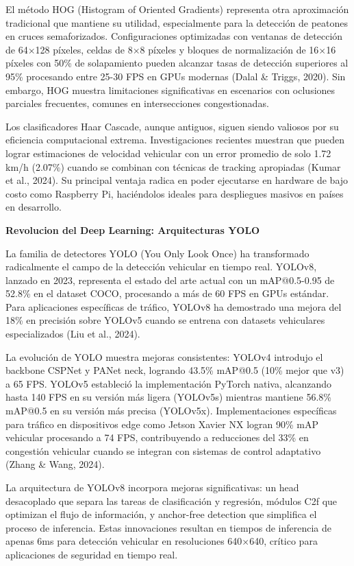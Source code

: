 \documentclass[12pt,a4paper,oneside]{report}
\begin{document}
El método HOG (Histogram of Oriented Gradients) representa otra aproximación tradicional que mantiene su utilidad, especialmente para la detección de peatones en cruces semaforizados. Configuraciones optimizadas con ventanas de detección de 64\ensuremath{\times}128 píxeles, celdas de 8\ensuremath{\times}8 píxeles y bloques de normalización de 16\ensuremath{\times}16 píxeles con 50\% de solapamiento pueden alcanzar tasas de detección superiores al 95\% procesando entre 25-30 FPS en GPUs modernas (Dalal \& Triggs, 2020). Sin embargo, HOG muestra limitaciones significativas en escenarios con oclusiones parciales frecuentes, comunes en intersecciones congestionadas.

Los clasificadores Haar Cascade, aunque antiguos, siguen siendo valiosos por su eficiencia computacional extrema. Investigaciones recientes muestran que pueden lograr estimaciones de velocidad vehicular con un error promedio de solo 1.72 km/h (2.07\%) cuando se combinan con técnicas de tracking apropiadas (Kumar et al., 2024). Su principal ventaja radica en poder ejecutarse en hardware de bajo costo como Raspberry Pi, haciéndolos ideales para despliegues masivos en países en desarrollo.

\textbf{Revolucion del Deep Learning: Arquitecturas YOLO}

La familia de detectores YOLO (You Only Look Once) ha transformado radicalmente el campo de la detección vehicular en tiempo real. YOLOv8, lanzado en 2023, representa el estado del arte actual con un mAP@0.5-0.95 de 52.8\% en el dataset COCO, procesando a más de 60 FPS en GPUs estándar. Para aplicaciones específicas de tráfico, YOLOv8 ha demostrado una mejora del 18\% en precisión sobre YOLOv5 cuando se entrena con datasets vehiculares especializados (Liu et al., 2024).

La evolución de YOLO muestra mejoras consistentes: YOLOv4 introdujo el backbone CSPNet y PANet neck, logrando 43.5\% mAP@0.5 (10\% mejor que v3) a 65 FPS. YOLOv5 estableció la implementación PyTorch nativa, alcanzando hasta 140 FPS en su versión más ligera (YOLOv5s) mientras mantiene 56.8\% mAP@0.5 en su versión más precisa (YOLOv5x). Implementaciones específicas para tráfico en dispositivos edge como Jetson Xavier NX logran 90\% mAP vehicular procesando a 74 FPS, contribuyendo a reducciones del 33\% en congestión vehicular cuando se integran con sistemas de control adaptativo (Zhang \& Wang, 2024).

La arquitectura de YOLOv8 incorpora mejoras significativas: un head desacoplado que separa las tareas de clasificación y regresión, módulos C2f que optimizan el flujo de información, y anchor-free detection que simplifica el proceso de inferencia. Estas innovaciones resultan en tiempos de inferencia de apenas 6ms para detección vehicular en resoluciones 640\ensuremath{\times}640, crítico para aplicaciones de seguridad en tiempo real.
\end{document}
